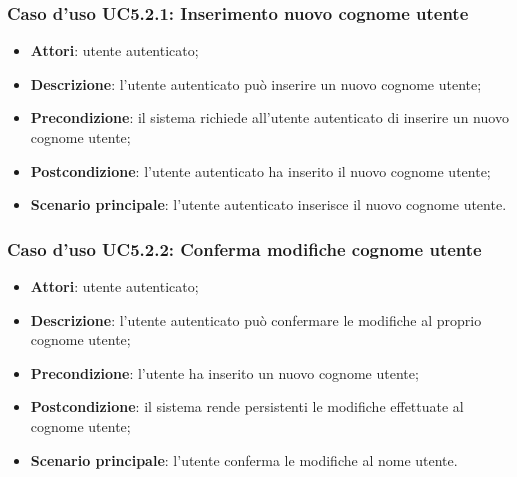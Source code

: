 \subsubsection{Caso d'uso UC5.2.1: Inserimento nuovo cognome utente}

\begin{itemize}
	\item \textbf{Attori}: utente autenticato;
	\item \textbf{Descrizione}: l'utente autenticato può inserire un nuovo cognome utente;
	\item \textbf{Precondizione}:  il sistema richiede all'utente autenticato di inserire un nuovo cognome utente;
	\item \textbf{Postcondizione}:  l'utente autenticato ha inserito il nuovo cognome utente;
	\item \textbf{Scenario principale}: l'utente autenticato inserisce il nuovo cognome utente.
\end{itemize}

\subsubsection{Caso d'uso UC5.2.2: Conferma modifiche cognome utente}

\begin{itemize}
	\item \textbf{Attori}: utente autenticato;
	\item \textbf{Descrizione}: l'utente autenticato può confermare le modifiche al proprio cognome utente;
	\item \textbf{Precondizione}: l'utente ha inserito un nuovo cognome utente;
	\item \textbf{Postcondizione}: il sistema rende persistenti le modifiche effettuate al cognome utente;
	\item \textbf{Scenario principale}: l'utente conferma le modifiche al nome utente.
\end{itemize}

